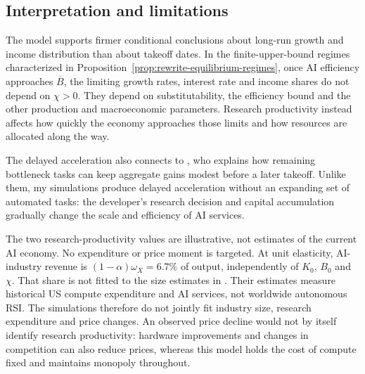 \subsection{Interpretation and limitations}
\label{subsec:rewrite-rsi-limitations}

The model supports firmer conditional conclusions about long-run growth and income distribution than about takeoff dates. In the finite-upper-bound regimes characterized in Proposition~\ref{prop:rewrite-equilibrium-regimes}, once AI efficiency approaches $\overline B$, the limiting growth rates, interest rate and income shares do not depend on $\chi>0$. They depend on substitutability, the efficiency bound and the other production and macroeconomic parameters. Research productivity instead affects how quickly the economy approaches those limits and how resources
are allocated along the way. %

The delayed acceleration also connects to \citet{jones2026future}, who explains how remaining bottleneck tasks can keep aggregate gains modest
before a later takeoff. Unlike them, my simulations produce delayed acceleration without an expanding set of automated tasks: the developer's research decision and capital accumulation gradually change the scale and efficiency of AI services. %

The two research-productivity values are illustrative, not estimates of the current AI economy. No expenditure or price moment is targeted.
At unit elasticity, AI-industry revenue is
$(1-\alpha)\omega_X=6.7\%$ of output, independently of $K_0$, $B_0$ and $\chi$. That share is not fitted to the size estimates in \citet{korinekmckelvey2026}. Their estimates measure historical US compute
expenditure and AI services, not worldwide autonomous RSI. The simulations therefore do not jointly fit industry size, research expenditure and price
changes. An observed price decline would not by itself identify research productivity: hardware improvements and changes in competition can also
reduce prices, whereas this model holds the cost of compute fixed and
maintains monopoly throughout.

